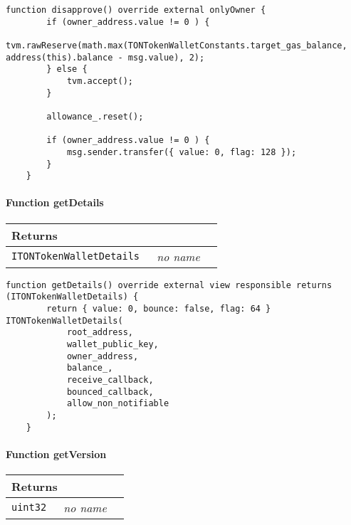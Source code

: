 \vspace{2cm}

\begin{lstlisting}[firstnumber=148]
    function disapprove() override external onlyOwner {
        if (owner_address.value != 0 ) {
            tvm.rawReserve(math.max(TONTokenWalletConstants.target_gas_balance, address(this).balance - msg.value), 2);
        } else {
            tvm.accept();
        }

        allowance_.reset();

        if (owner_address.value != 0 ) {
            msg.sender.transfer({ value: 0, flag: 128 });
        }
    }
\end{lstlisting}

\paragraph{Function getDetails}


\ifsoltables
\noindent\begin{tabular}{|l|l|p{5cm}|}\hline
\multicolumn{3}{|l|}{\bf Returns}\\\hline
\tt ITONTokenWalletDetails & {\em no name} &\\\hline
\end{tabular}
\fi

\vspace{2cm}

\begin{lstlisting}[firstnumber=72]
    function getDetails() override external view responsible returns (ITONTokenWalletDetails) {
        return { value: 0, bounce: false, flag: 64 } ITONTokenWalletDetails(
            root_address,
            wallet_public_key,
            owner_address,
            balance_,
            receive_callback,
            bounced_callback,
            allow_non_notifiable
        );
    }
\end{lstlisting}

\paragraph{Function getVersion}


\ifsoltables
\noindent\begin{tabular}{|l|l|p{5cm}|}\hline
\multicolumn{3}{|l|}{\bf Returns}\\\hline
\tt uint32 & {\em no name} &\\\hline
\end{tabular}
\fi

